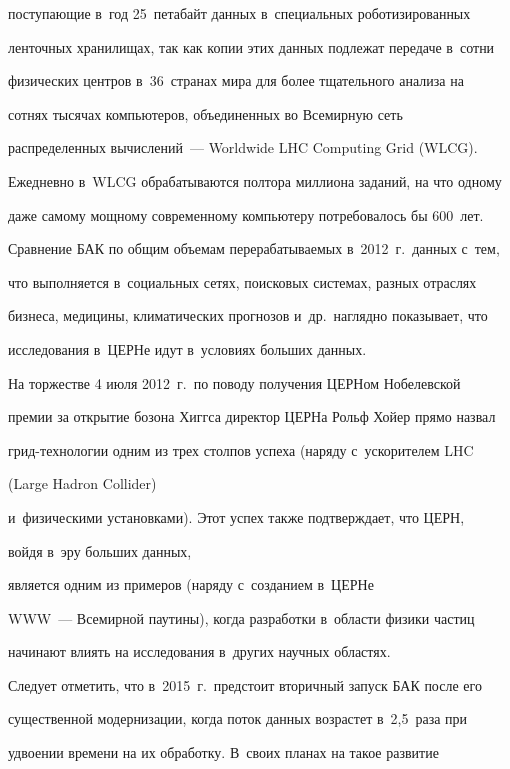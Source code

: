 поступающие в~год 25~петабайт данных в~специальных роботизированных


ленточных хранилищах, так как копии этих данных подлежат передаче в~сотни


физических центров в~36~странах мира для более тщательного анализа на


сотнях тысячах компьютеров, объединенных во Всемирную сеть


распределенных вычислений~--- Worldwide LHC Computing Grid (WLCG).


Ежедневно в~WLCG обрабатываются полтора миллиона заданий, на что одному


даже самому мощному современному компьютеру потребовалось бы 600~лет.


Сравнение БАК по общим объемам перерабатываемых в~2012~г.\ данных с~тем,


что выполняется в~социальных сетях, поисковых системах, разных отраслях


бизнеса, медицины, климатических прогнозов и~др.\ наглядно показывает, что


исследования в~ЦЕРНе идут в~условиях больших данных.





  На торжестве 4 июля 2012~г.\ по поводу получения ЦЕРНом Нобелевской


премии за открытие бозона Хиггса директор ЦЕРНа Рольф Хойер прямо назвал


грид-технологии одним из трех столпов успеха (наряду с~ускорителем LHC


(Large Hadron Collider)


и~физическими установками). Этот успех также подтверждает, что ЦЕРН,


войдя в~эру больших данных,


 является одним из примеров (наряду с~созданием в~ЦЕРНе


WWW~--- Всемирной паутины), когда разработки в~области физики частиц


начинают влиять на исследования в~других научных областях.





  Следует отметить, что в~2015~г.\ предстоит вторичный запуск БАК после его


существенной модернизации, когда поток данных возрастет в~2,5~раза при


удвоении времени на их обработку. В~своих планах на такое развитие


